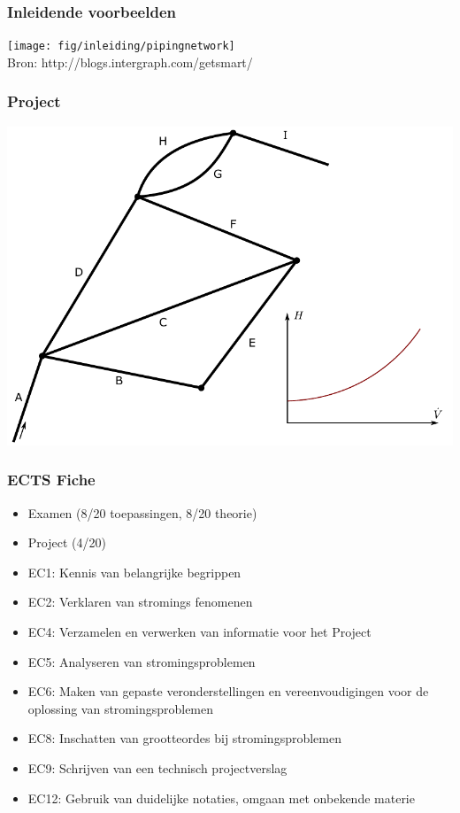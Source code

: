 \documentclass[t]{beamer}
\begin{document}
	\begin{frame}
		\frametitle{Inleidende voorbeelden}
		\center
    	\texttt{[image: fig/inleiding/pipingnetwork]}\\
    	\footnotesize{Bron: http://blogs.intergraph.com/getsmart/}
  	\end{frame}
	\begin{frame}
		\frametitle{Project}
		\center
    	\includegraphics[height=0.8\textheight]{fig/inleiding/project_leigingkarakteristiek}\\
  	\end{frame}  	
	\begin{frame}
		\frametitle{ECTS Fiche}
		\begin{itemize}
			\item Examen (8/20 toepassingen, 8/20 theorie)
			\item Project (4/20)
		\end{itemize}
		\begin{itemize}
			\item EC1: Kennis van belangrijke begrippen
			\item EC2: Verklaren van stromings fenomenen
			\item EC4: Verzamelen en verwerken van informatie voor het Project
			\item EC5: Analyseren van stromingsproblemen
			\item EC6: Maken van gepaste veronderstellingen en vereenvoudigingen voor de oplossing van stromingsproblemen
			\item EC8: Inschatten van grootteordes bij stromingsproblemen
			\item EC9: Schrijven van een technisch projectverslag
			\item EC12: Gebruik van duidelijke notaties, omgaan met onbekende materie		
		\end{itemize}
  	\end{frame}
\end{document}
